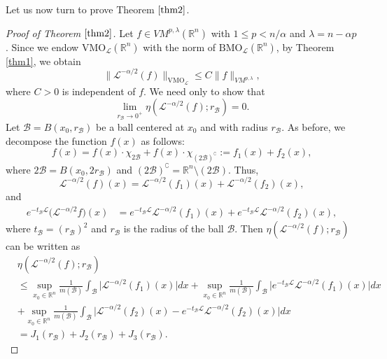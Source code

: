 \documentclass[10pt, reqno]{amsart}
\theoremstyle{definition}
\theoremstyle{remark}
\numberwithin{equation}{section}
\begin{document}
Let us now turn to prove Theorem $\ref{thm2}$.
\begin{proof}[Proof of Theorem $\ref{thm2}$]
Let $f\in V{M}^{p,\lambda}(\mathbb R^n)$ with $1\leq p<n/{\alpha}$ and $\lambda=n-\alpha p$. Since we endow $\mathrm{VMO}_{\mathcal{L}}(\mathbb R^n)$ with the norm of $\mathrm{BMO}_{\mathcal{L}}(\mathbb R^n)$, by Theorem \ref{thm1}, we obtain
\begin{equation*}
\big\|\mathcal L^{-\alpha/2}(f)\big\|_{\mathrm{VMO}_{\mathcal{L}}}
\leq C\big\|f\big\|_{V{M}^{p,\lambda}},
\end{equation*}
where $C>0$ is independent of $f$. We need only to show that
\begin{equation}\label{main22}
\lim_{r_{\mathcal{B}}\to 0^{+}}\eta(\mathcal L^{-\alpha/2}(f);r_{\mathcal{B}})=0.
\end{equation}
Let $\mathcal{B}=B(x_0,r_{\mathcal{B}})$ be a ball centered at $x_0$ and with radius $r_{\mathcal{B}}$. As before, we decompose the function $f(x)$ as follows:
\begin{equation*}
f(x)=f(x)\cdot\chi_{2\mathcal{B}}+f(x)\cdot\chi_{(2\mathcal{B})^{\complement}}:=f_1(x)+f_2(x),
\end{equation*}
where $2\mathcal{B}=B(x_0,2r_{\mathcal{B}})$ and $(2\mathcal{B})^{\complement}=\mathbb R^n\setminus(2\mathcal{B})$. Thus,
\begin{equation*}
\mathcal L^{-\alpha/2}(f)(x)=\mathcal{L}^{-\alpha/2}(f_1)(x)
+\mathcal{L}^{-\alpha/2}(f_2)(x),
\end{equation*}
and
\begin{equation*}
\begin{split}
e^{-t_{\mathcal{B}}\mathcal{L}}\big(\mathcal L^{-\alpha/2}f\big)(x)
&=e^{-t_{\mathcal{B}}\mathcal{L}}\mathcal{L}^{-\alpha/2}(f_1)(x)+
e^{-t_{\mathcal{B}}\mathcal{L}}\mathcal{L}^{-\alpha/2}(f_2)(x),
\end{split}
\end{equation*}
where $t_{\mathcal{B}}=(r_{\mathcal{B}})^2$ and $r_{\mathcal{B}}$ is the radius of the ball $\mathcal{B}$. Then $\eta(\mathcal L^{-\alpha/2}(f);r_{\mathcal{B}})$ can be written as
\begin{equation*}
\begin{split}
&\eta(\mathcal L^{-\alpha/2}(f);r_{\mathcal{B}})\\
&\leq \sup_{x_0\in\mathbb R^n}\frac{1}{m(\mathcal{B})}\int_{\mathcal{B}}\big|\mathcal{L}^{-\alpha/2}(f_1)(x)\big|dx
+\sup_{x_0\in\mathbb R^n}\frac{1}{m(\mathcal{B})}\int_{\mathcal{B}}\big|e^{-t_{\mathcal{B}}\mathcal{L}}\mathcal{L}^{-\alpha/2}(f_1)(x)\big|dx\\
&+\sup_{x_0\in\mathbb R^n}\frac{1}{m(\mathcal{B})}
\int_{\mathcal{B}}\big|\mathcal L^{-\alpha/2}(f_2)(x)-e^{-t_{\mathcal{B}}\mathcal{L}}\mathcal L^{-\alpha/2}(f_2)(x)\big|dx\\
&=J_1(r_{\mathcal{B}})+J_2(r_{\mathcal{B}})+J_3(r_{\mathcal{B}}).
\end{split}
\end{equation*}


\end{proof}
\end{document}
